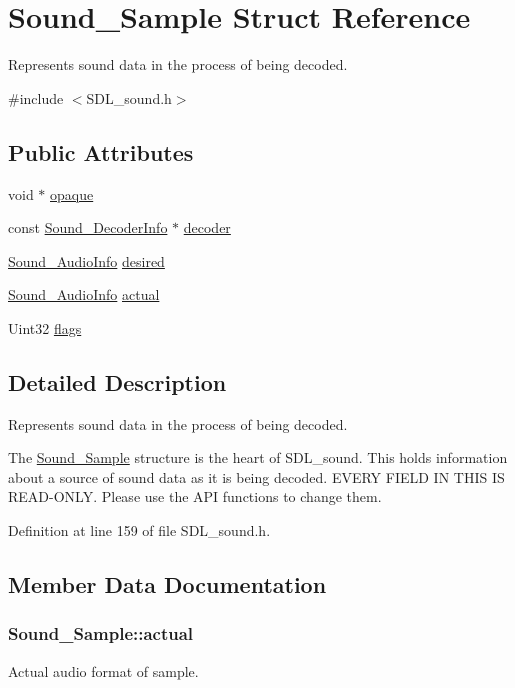 \hypertarget{structSound__Sample}{\section{Sound\-\_\-\-Sample Struct Reference}
\label{structSound__Sample}
}


Represents sound data in the process of being decoded.  




{\ttfamily \#include $<$S\-D\-L\-\_\-sound.\-h$>$}

\subsection*{Public Attributes}
\begin{DoxyCompactItemize}
\item 
void $\ast$ \hyperlink{structSound__Sample_af9b14d108498631919187832d74efa11}{opaque}
\item 
const \hyperlink{structSound__DecoderInfo}{Sound\-\_\-\-Decoder\-Info} $\ast$ \hyperlink{structSound__Sample_a03ef7710992520e65edacc9ad694b034}{decoder}
\item 
\hyperlink{structSound__AudioInfo}{Sound\-\_\-\-Audio\-Info} \hyperlink{structSound__Sample_aca3059080501599b2fef90032122108d}{desired}
\item 
\hyperlink{structSound__AudioInfo}{Sound\-\_\-\-Audio\-Info} \hyperlink{structSound__Sample_a4862ebaacdb0d4ec3aa3f7874ef2b903}{actual}
\item 
Uint32 \hyperlink{structSound__Sample_a0faf525fbd34bc2553be187c4fcee8d1}{flags}
\end{DoxyCompactItemize}


\subsection{Detailed Description}
Represents sound data in the process of being decoded. 

The \hyperlink{structSound__Sample}{Sound\-\_\-\-Sample} structure is the heart of S\-D\-L\-\_\-sound. This holds information about a source of sound data as it is being decoded. E\-V\-E\-R\-Y F\-I\-E\-L\-D I\-N T\-H\-I\-S I\-S R\-E\-A\-D-\/\-O\-N\-L\-Y. Please use the A\-P\-I functions to change them. 

Definition at line 159 of file S\-D\-L\-\_\-sound.\-h.



\subsection{Member Data Documentation}
\hypertarget{structSound__Sample_a4862ebaacdb0d4ec3aa3f7874ef2b903}{
\subsubsection[{actual}]{ {\bf Sound\-\_\-\-Sample\-::actual}}}\label{structSound__Sample_a4862ebaacdb0d4ec3aa3f7874ef2b903}
Actual audio format of sample. 

